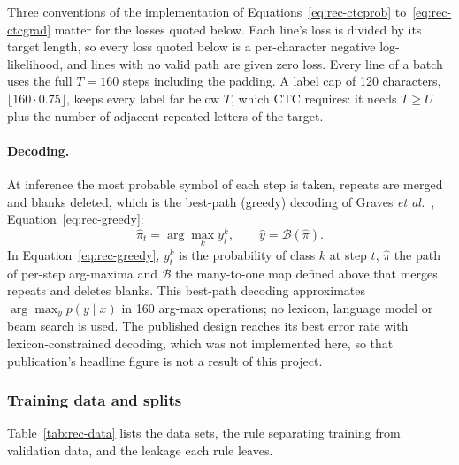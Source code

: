 Three conventions of the implementation of Equations~\ref{eq:rec-ctcprob} to~\ref{eq:rec-ctcgrad} matter for the losses quoted below.
Each line's loss is divided by its target length, so every loss quoted below is a per-character negative log-likelihood, and lines with no valid path are given zero loss.
Every line of a batch uses the full $T=160$ steps including the padding.
A label cap of 120 characters, $\lfloor160\cdot0.75\rfloor$, keeps every label far below $T$, which CTC requires: it needs $T\ge U$ plus the number of adjacent repeated letters of the target.


\paragraph{Decoding.}
At inference the most probable symbol of each step is taken, repeats are merged and blanks deleted, which is the best-path (greedy) decoding of Graves \emph{et al.}~\cite{graves2006}, Equation~\ref{eq:rec-greedy}:
\begin{equation}
\hat\pi_t=\arg\max_k y_t^k,\qquad \hat y=\mathcal B(\hat\pi).
\label{eq:rec-greedy}
\end{equation}
In Equation~\ref{eq:rec-greedy}, $y_t^k$ is the probability of class $k$ at step $t$, $\hat\pi$ the path of per-step arg-maxima and $\mathcal B$ the many-to-one map defined above that merges repeats and deletes blanks.
This best-path decoding approximates $\arg\max_y p(y\mid x)$ in 160 arg-max operations; no lexicon, language model or beam search is used.
The published design reaches its best error rate with lexicon-constrained decoding, which was not implemented here, so that publication's headline figure is not a result of this project.

\subsubsection{Training data and splits}

Table~\ref{tab:rec-data} lists the data sets, the rule separating training from validation data, and the leakage each rule leaves.

